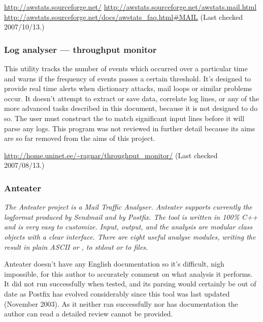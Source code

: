 \documentclass[a4paper,12pt,draft]{article}
\begin{document}

\noindent\url{http://awstats.sourceforge.net/} \newline
\url{http://awstats.sourceforge.net/awstats.mail.html} \newline
\url{http://awstats.sourceforge.net/docs/awstats_faq.html#MAIL}
\newline (Last checked 2007/10/13.)

\subsubsection{Log analyser --- throughput monitor}

This utility tracks the number of events which occurred over a particular
time and warns if the frequency of events passes a certain threshold.  It's
designed to provide real time alerts when dictionary attacks, mail loops or
similar problems occur. It doesn't attempt to extract or save data,
correlate log lines, or any of the more advanced tasks described in this
document, because it is not designed to do so.  The user must construct the
\regexes{} to match significant input lines before it will parse any logs.
This program was not reviewed in further detail because its aims are so far
removed from the aims of this project.

\url{http://home.uninet.ee/~ragnar/throughput_monitor/} \newline (Last
checked 2007/08/13.)

\subsubsection{Anteater}

\textit{The Anteater project is a Mail Traffic Analyser. Anteater supports
currently the logformat produced by Sendmail and by Postfix. The tool is
written in 100\% C++ and is very easy to customize. Input, output, and the
analysis are modular class objects with a clear interface. There are eight
useful analyse modules, writing the result in plain ASCII or \HTML{}, to
stdout or to files.\/}

Anteater doesn't have any English documentation so it's difficult, nigh
impossible, for this author to accurately comment on what analysis it
performs.  It did not run successfully when tested, and its parsing would
certainly be out of date as Postfix has evolved considerably since this
tool was last updated (November 2003).  As it neither ran successfully nor
has documentation the author can read a detailed review cannot be provided.
\end{document}

